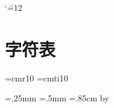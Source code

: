 
\catcode`\"=12

\hbox{}\vskip-80pt \hbox{}
\section{字符表}
\hbox{}\vskip-40pt \hbox{}

\def\titlefont{\SansSerif \pointSize:10 \Style:roman }
\let\titlefont\relax
\def\bitfont{\SerifFont \pointSize:7 \Style:Roman }
\let\bitfont\relax
\def\codefont{\SansSerif \pointSize:5 \Style:roman }
\let\codefont\relax
\def\namefont{\SansSerif \pointSize:11 \Style:roman }
\let\namefont\relax
\let\commentfont\titlefont
\font\cmtenrm=cmr10 \font\cmtenit=cmti10

\newdimen\thinlinewidth \thinlinewidth=.25mm
\newdimen\fatlinewidth \fatlinewidth=.5mm
\newdimen\rowheight \rowheight=.85cm %
\newdimen\colwidth  \colwidth=1.2cm %
\newdimen\Colwidth {}\colwidth
  \advance\Colwidth by \thinlinewidth
\newdimen\topwhite \topwhite=2pt
\newdimen\botwhite \botwhite=3pt
\newdimen\leftwhite \leftwhite=0pt %
\newdimen\rightwhite \rightwhite=1pt %
\newcount\rowcount
\newcount\colcount
{} %
\newcount\thenumber

\def\\{$\backslash$}\def\-{\_$\!$\_}\def\^{\char94}
\def\hh#1{\char'136\char'136 {#1}\ignorespaces}
\def\thinline{\vrule width \thinlinewidth}
\def\fatline{\vrule width \fatlinewidth}

\def\calcnumber{{\multiply\colcount by 16
                 \advance\colcount by \rowcount
                 \global\thenumber=\colcount}}
\def\deccode{\number\thenumber}
\def\octcode{{\ifnum\thenumber>63
                            \advance\thenumber by -64
                            \count0=\thenumber \divide\count0 by 8
                            1\number\count0
              \else         \count0=\thenumber \divide\count0 by 8
                            \ifnum\count0>0 \number\count0 \fi\fi
              \multiply\count0 by 8
              \advance\thenumber by -\count0
              \number\thenumber}}
\def\hexdigit#1{\ifcase#1 0\or 1\or 2\or 3\or 4\or 5\or 6\or 7\or
                          8\or 9\or A\or B\or C\or D\or E\or F\or
                          \edef\tmp{\message{illegal hex digit
                                        \number#1}}\tmp
                          \fi}
\def\hexcode{{\count0=\thenumber \divide\count0 by 16
              \ifnum\count0>0 \hexdigit{\count0}\fi
              \multiply\count0 by 16
              \advance\thenumber by -\count0 \count0=\thenumber
              \hexdigit{\count0}}}

